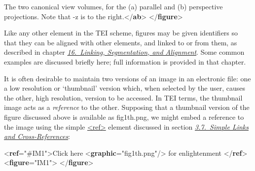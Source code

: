 \begin{shaded}
The two canonical view volumes, for the (a)\mbox{}\newline 
\hspace*{1em}\hspace*{1em} parallel and (b) perspective projections. Note that -z is to the\mbox{}\newline 
\hspace*{1em}\hspace*{1em} right.{</\textbf{ab}>}\mbox{}\newline 
{</\textbf{figure}>}\end{shaded}\egroup\par \noindent  \par
Like any other element in the TEI scheme, figures may be given identifiers so that they can be aligned with other elements, and linked to or from them, as described in chapter \textit{\hyperref[SA]{16.\ Linking, Segmentation, and Alignment}}. Some common examples are discussed briefly here; full information is provided in that chapter.\par
It is often desirable to maintain two versions of an image in an electronic file: one a low resolution or ‘thumbnail’ version which, when selected by the user, causes the other, high resolution, version to be accessed. In TEI terms, the thumbnail image acts as a \textit{reference} to the other. Supposing that a thumbnail version of the figure discussed above is available as \textsf{fig1th.png}, we might embed a reference to the image using the simple \hyperref[TEI.ref]{<ref>} element discussed in section \textit{\hyperref[COXR]{3.7.\ Simple Links and Cross-References}}: \par\bgroup{}\exampleFont \begin{shaded}\noindent\mbox{}{<\textbf{ref}\hspace*{1em}{target}="{\#IM1}">}Click\mbox{}\newline 
 here {<\textbf{graphic}\hspace*{1em}{url}="{fig1th.png}"/>} for enlightenment {</\textbf{ref}>}\mbox{}\newline 
{<\textbf{figure}\hspace*{1em}{xml:id}="{IM1}">}\mbox{}\newline 
{}\mbox{}\newline 
{</\textbf{figure}>}\end{shaded}\egroup\par \par
